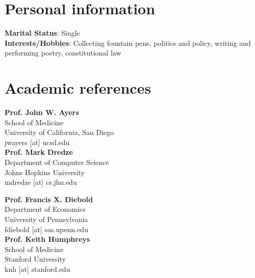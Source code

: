 \documentclass[10pt, letterpaper]{article}
\begin{document}
\clearpage

\section*{Personal information}
\textbf{Marital Status}: Single\\[.2cm]
\textbf{Interests/Hobbies}: Collecting fountain pens, politics and policy, writing and performing poetry, constitutional law\\[.2cm]

\section*{Academic references}
\noindent{\tabcolsep}\begin{minipage}{0.65\linewidth}
  \textbf{Prof. John W. Ayers}\\
  School of Medicine\\
  University of California, San Diego\\
  jwayers [at] ucsd.edu\\[0.2cm]

  \textbf{Prof. Mark Dredze}\\
  Department of Computer Science\\
  Johns Hopkins University\\
  mdredze [at] cs.jhu.edu
\end{minipage}
\begin{minipage}{0.35\linewidth}
  \textbf{Prof. Francis X. Diebold}\\
  Department of Economics\\
  University of Pennsylvania\\
  fdiebold [at] sas.upenn.edu\\[0.2cm]

  \textbf{Prof. Keith Humphreys}\\
  School of Medicine\\
  Stanford University\\
  knh [at] stanford.edu
\end{minipage}\\[.2cm]
\end{document}
